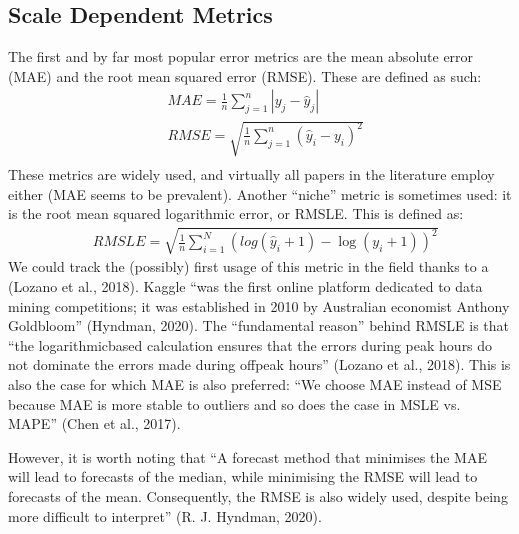 \documentclass[letterpaper,10pt,english]{jupyterBook}
\begin{document}
\subsection{Scale Dependent Metrics}
\label{\detokenize{06-forecasting:scale-dependent-metrics}}
\sphinxAtStartPar
The first and by far most popular error metrics are the mean absolute error (MAE) and the root mean squared error (RMSE). These are defined as such:
\label{equation:06-forecasting:c16f73bd-3a84-4435-9db5-2b60948673fa}\begin{align}
&MAE = \frac{1}{n}\sum_{j = 1}^n \left| {{y_j} - {{\hat y}_j}} \right|\\
&RMSE=\sqrt{\frac{1}{n}\sum_{j=1}^{n}(\hat{y}_{i}-y_{i})^{2}}\\
\end{align}
\sphinxAtStartPar
These metrics are widely used, and virtually all papers in the literature employ either (MAE seems to be prevalent). Another “niche” metric is sometimes used: it is the root mean squared logarithmic error, or RMSLE. This is defined as:
\label{equation:06-forecasting:2d9678ca-57bf-447e-8549-7bdce37b31d1}\begin{align}
&RMSLE =\sqrt{\frac{1}{n}\sum_{i=1}^{N}(log(\hat{y}_{i}+1)-\log(y_{i}+1))^{2}}
\end{align}
\sphinxAtStartPar
We could track the (possibly) first usage of this metric in the field thanks to a  (Lozano et al., 2018). Kaggle “was the first online platform dedicated to data mining competitions; it was established in 2010 by Australian economist Anthony Goldbloom” (Hyndman, 2020). The “fundamental reason” behind RMSLE is that “the logarithmic\sphinxhyphen{}based calculation ensures that the errors during peak hours do not dominate the errors made during off\sphinxhyphen{}peak hours” (Lozano et al., 2018). This is also the case for which MAE is also preferred: “We choose MAE instead of MSE because MAE is more stable to outliers and so does the case in MSLE vs. MAPE” (Chen et al., 2017).

\sphinxAtStartPar
However, it is worth noting that “A forecast method that minimises the MAE will lead to forecasts of the median, while minimising the RMSE will lead to forecasts of the mean. Consequently, the RMSE is also widely used, despite being more difficult to interpret” (R. J. Hyndman, 2020).
\end{document}
